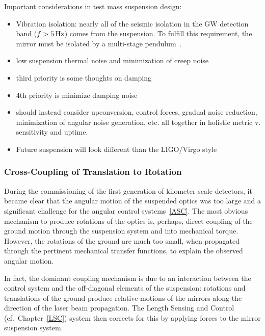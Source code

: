 Important considerations in test mass suspension design\cite{SUS:2012, Aston:2012}:
\begin{itemize}
   \item Vibration isolation: nearly all of the seismic isolation in the GW detection band ($f > 5\,\rm Hz$)
     comes from the suspension. To fulfill this requirement, the mirror must be isolated by a
     multi-stage pendulum~\cite{Beker:2011}.
    \item low suspension thermal noise and minimization of creep noise~\cite{Levin:2012ek, Gretarsson:2005gs}
    \item third priority is some thoughts on damping
    \item 4th priority is minimize damping noise
    \item should instead consider upconversion, control forces, gradual noise reduction, minimization of angular noise generation, etc. all together in holistic metric v. sensitivity and uptime.
    \item Future suspension will look different than the LIGO/Virgo style
\end{itemize}

\subsubsection{Cross-Coupling of Translation to Rotation}
During the commissioning of the first generation of kilometer scale detectors, it became clear that the angular motion of the suspended optics was too large and a significant challenge for the angular control systems~\ref{ASC}. The most obvious mechanism to produce rotations of the optics is, perhaps, direct coupling of the ground motion through the suspension system and into mechanical torque. However, the rotations of the ground are much too small, when propagated through the pertinent mechanical transfer functions, to explain the observed angular motion.

In fact, the dominant coupling mechanism is due to an interaction between the control system and the off-diagonal elements of the suspension: rotations and translations of the ground produce relative motions of the mirrors along the direction of the laser beam propagation. The Length Sensing and Control (cf.~Chapter~\ref{LSC}) system then corrects for this by applying forces to the mirror suspension system.

